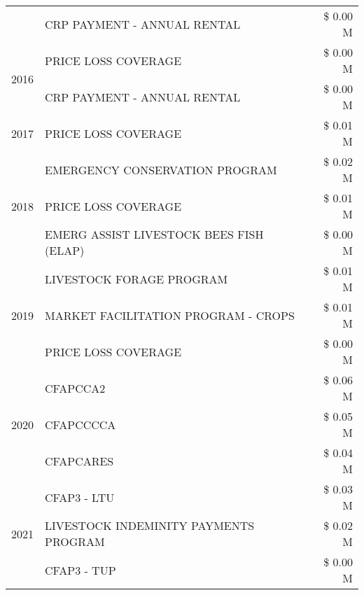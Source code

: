\begin{tabular}{llr}
 & CRP PAYMENT - ANNUAL RENTAL & \$ 0.00 M \\
\cline{1-3}
\multirow[t]{2}{*}{2016} & PRICE LOSS COVERAGE & \$ 0.00 M \\
 & CRP PAYMENT - ANNUAL RENTAL & \$ 0.00 M \\
\cline{1-3}
2017 & PRICE LOSS COVERAGE & \$ 0.01 M \\
\cline{1-3}
\multirow[t]{3}{*}{2018} & EMERGENCY CONSERVATION PROGRAM & \$ 0.02 M \\
 & PRICE LOSS COVERAGE & \$ 0.01 M \\
 & EMERG ASSIST LIVESTOCK BEES FISH (ELAP) & \$ 0.00 M \\
\cline{1-3}
\multirow[t]{3}{*}{2019} & LIVESTOCK FORAGE PROGRAM & \$ 0.01 M \\
 & MARKET FACILITATION PROGRAM - CROPS & \$ 0.01 M \\
 & PRICE LOSS COVERAGE & \$ 0.00 M \\
\cline{1-3}
\multirow[t]{3}{*}{2020} & CFAPCCA2 & \$ 0.06 M \\
 & CFAPCCCCA & \$ 0.05 M \\
 & CFAPCARES & \$ 0.04 M \\
\cline{1-3}
\multirow[t]{3}{*}{2021} & CFAP3 - LTU & \$ 0.03 M \\
 & LIVESTOCK INDEMINITY PAYMENTS PROGRAM & \$ 0.02 M \\
 & CFAP3 - TUP & \$ 0.00 M \\
\cline{1-3}
\bottomrule
\end{tabular}
